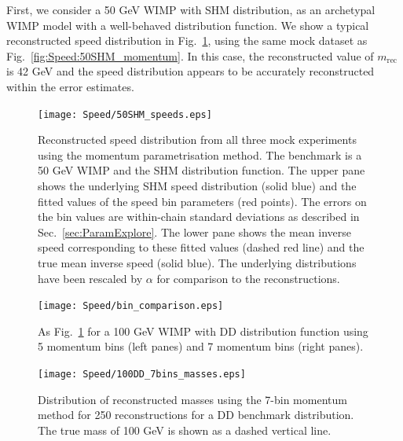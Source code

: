 First, we consider a 50 GeV WIMP with SHM distribution, as an archetypal WIMP model with a well-behaved distribution function. We show a typical reconstructed speed distribution in Fig.\ \ref{fig:Speed:SHM50}, using the same mock dataset as Fig.\ \ref{fig:Speed:50SHM_momentum}. In this case, the reconstructed value of \(m_\textrm{rec}\) is 42 GeV and the speed distribution appears to be accurately reconstructed within the error estimates.

 \begin{figure}[t]
\centering
\texttt{[image: Speed/50SHM\_speeds.eps]}
\caption[Reconstructed speed distribution from all three mock experiments using the momentum parametrisation method for a 50 GeV WIMP and SHM distribution function.]{Reconstructed speed distribution from all three mock experiments using the momentum parametrisation method. The benchmark is a 50 GeV WIMP and the SHM distribution function. The upper pane shows the underlying SHM speed distribution (solid blue) and the fitted values of the speed bin parameters (red points). The errors on the bin values are within-chain standard deviations as described in Sec.\ \ref{sec:ParamExplore}. The lower pane shows the mean inverse speed corresponding to these fitted values (dashed red line) and the true mean inverse speed (solid blue). The underlying distributions have been rescaled by \(\alpha\) for comparison to the reconstructions.}
  \label{fig:Speed:SHM50}
\end{figure}

 \begin{figure}[t]
\centering
  \texttt{[image: Speed/bin\_comparison.eps]}
\caption{As Fig.\ \ref{fig:Speed:SHM50} for a 100 GeV WIMP with DD distribution function using 5 momentum bins (left panes) and 7 momentum bins (right panes).}
  \label{fig:Speed:DD100}
\end{figure}

\begin{figure}[t]
\centering
\texttt{[image: Speed/100DD\_7bins\_masses.eps]}
\caption[Distribution of reconstructed masses using the 7-bin momentum method for a DD benchmark distribution.]{Distribution of reconstructed masses using the 7-bin momentum method for 250 reconstructions for a DD benchmark distribution. The true mass of 100 GeV is shown as a dashed vertical line.}
  \label{fig:Speed:7bins}
\end{figure}

